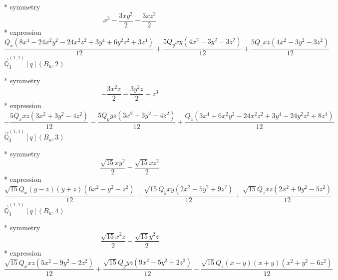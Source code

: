 \documentclass[fleqn,8pt]{jsarticle}
\begin{document}
\noindent\quad ** symmetry
\begin{dmath*}
x^{3} - \frac{3 x y^{2}}{2} - \frac{3 x z^{2}}{2}
\end{dmath*}
\noindent\quad ** expression
\begin{dmath*}
\frac{Q_{x} \left(8 x^{4} - 24 x^{2} y^{2} - 24 x^{2} z^{2} + 3 y^{4} + 6 y^{2} z^{2} + 3 z^{4}\right)}{12} + \frac{5 Q_{y} x y \left(4 x^{2} - 3 y^{2} - 3 z^{2}\right)}{12} + \frac{5 Q_{z} x z \left(4 x^{2} - 3 y^{2} - 3 z^{2}\right)}{12}
\end{dmath*}
\noindent\quad $\vec{\mathbb{Q}}_{3}^{(1,1)}[q](B_{u},2)$

\noindent\quad ** symmetry
\begin{dmath*}
- \frac{3 x^{2} z}{2} - \frac{3 y^{2} z}{2} + z^{3}
\end{dmath*}
\noindent\quad ** expression
\begin{dmath*}
- \frac{5 Q_{x} x z \left(3 x^{2} + 3 y^{2} - 4 z^{2}\right)}{12} - \frac{5 Q_{y} y z \left(3 x^{2} + 3 y^{2} - 4 z^{2}\right)}{12} + \frac{Q_{z} \left(3 x^{4} + 6 x^{2} y^{2} - 24 x^{2} z^{2} + 3 y^{4} - 24 y^{2} z^{2} + 8 z^{4}\right)}{12}
\end{dmath*}
\noindent\quad $\vec{\mathbb{Q}}_{3}^{(1,1)}[q](B_{u},3)$

\noindent\quad ** symmetry
\begin{dmath*}
\frac{\sqrt{15} x y^{2}}{2} - \frac{\sqrt{15} x z^{2}}{2}
\end{dmath*}
\noindent\quad ** expression
\begin{dmath*}
\frac{\sqrt{15} Q_{x} \left(y - z\right) \left(y + z\right) \left(6 x^{2} - y^{2} - z^{2}\right)}{12} - \frac{\sqrt{15} Q_{y} x y \left(2 x^{2} - 5 y^{2} + 9 z^{2}\right)}{12} + \frac{\sqrt{15} Q_{z} x z \left(2 x^{2} + 9 y^{2} - 5 z^{2}\right)}{12}
\end{dmath*}
\noindent\quad $\vec{\mathbb{Q}}_{3}^{(1,1)}[q](B_{u},4)$

\noindent\quad ** symmetry
\begin{dmath*}
\frac{\sqrt{15} x^{2} z}{2} - \frac{\sqrt{15} y^{2} z}{2}
\end{dmath*}
\noindent\quad ** expression
\begin{dmath*}
\frac{\sqrt{15} Q_{x} x z \left(5 x^{2} - 9 y^{2} - 2 z^{2}\right)}{12} + \frac{\sqrt{15} Q_{y} y z \left(9 x^{2} - 5 y^{2} + 2 z^{2}\right)}{12} - \frac{\sqrt{15} Q_{z} \left(x - y\right) \left(x + y\right) \left(x^{2} + y^{2} - 6 z^{2}\right)}{12}
\end{dmath*}
\end{document}
